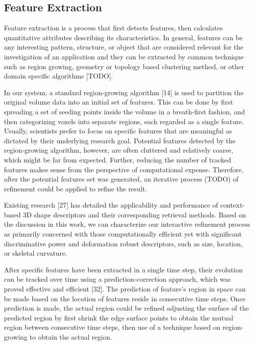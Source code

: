 \documentclass[10pt, conference, compsocconf]{IEEEtran}
\begin{document}
\subsection{Feature Extraction}
Feature extraction is a process that first detects features, then calculates quantitative attributes describing its characteristics. In general, features can be any interesting pattern, structure, or object that are considered relevant for the investigation of an application and they can be extracted by common technique such as region growing, geometry or topology based clustering method, or other domain specific algorithms [TODO]. 

In our system, a standard region-growing algorithm [14] is used to partition the original volume data into an initial set of features. This can be done by first spreading a set of seeding points inside the volume in a breath-first fashion, and then categorizing voxels into separate regions, each regarded as a single feature. Usually, scientists prefer to focus on specific features that are meaningful as dictated by their underlying research goal. Potential features detected by the region-growing algorithm, however, are often cluttered and relatively coarse, which might be far from expected. Further, reducing the number of tracked features makes sense from the perspective of computational expense. Therefore, after the potential features set was generated, an iterative process (TODO) of refinement could be applied to refine the result. 

Existing research [27] has detailed the applicability and performance of context-based 3D shape descriptors and their corresponding retrieval methods. Based on the discussion in this work, we can characterize our interactive refinement process as primarily concerned with those computationally efficient yet with significant discriminative power and deformation robust descriptors, such as size, location, or skeletal curvature. 

After specific features have been extracted in a single time step, their evolution can be tracked over time using a prediction-correction approach, which was proved effective and efficient [32]. The prediction of feature's region in space can be made based on the location of features reside in consecutive time steps. Once prediction is made, the actual region could be refined adjusting the surface of the predicted region by first shrink the edge surface points to obtain the mutual region between consecutive time steps, then use of a technique based on region-growing to obtain the actual region.
\end{document}
